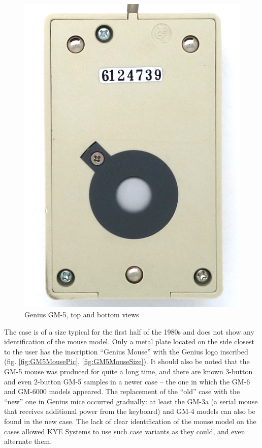 \documentclass[11pt, a4paper]{article}
\begin{document}
\begin{figure}[h]
    \includegraphics[scale=0.8]{1987_genius_gm5_mouse/bottom_30.jpg}
    \caption{Genius GM-5, top and bottom views}
    \label{fig:GM5MouseTopAndBottom}
\end{figure}

The case is of a size typical for the first half of the 1980s and does not show any identification of the mouse model. Only a metal plate located on the side closest to the user has the inscription ``Genius Mouse'' with the Genius logo inscribed (fig. \ref{fig:GM5MousePic}, \ref{fig:GM5MouseSize}). It should also be noted that the GM-5 mouse was produced for quite a long time, and there are known 3-button and even 2-button GM-5 samples in a newer case -- the one in which the GM-6 and GM-6000 \cite{commodore, atari} models appeared. The replacement of the ``old'' case with the ``new'' one in Genius mice occurred gradually: at least the GM-3a (a serial mouse that receives additional power from the keyboard) and GM-4 models can also be found in the new case. The lack of clear identification of the mouse model on the cases allowed KYE Systems to use such case variants as they could, and even alternate them.
\end{document}

